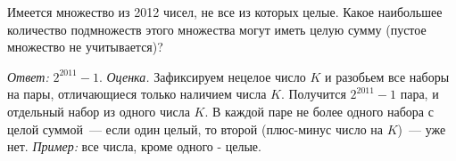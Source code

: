 \problem
Имеется множество из 2012 чисел, не все из которых целые.
Какое наибольшее количество подмножеств этого множества могут иметь целую
сумму (пустое множество не учитывается)?

\solution
\emph{Ответ:} $2^{2011} - 1$.
\emph{Оценка.}
Зафиксируем нецелое число $K$ и разобьем все наборы на пары, отличающиеся
только наличием числа $K$.
Получится $2^{2011} - 1$ пара, и отдельный набор из одного числа $K$.
В каждой паре не более одного набора с целой суммой~--- если один целый,
то второй (плюс-минус число на $K$)~--- уже нет.
\emph{Пример:}
все числа, кроме одного - целые.

\endproblem
